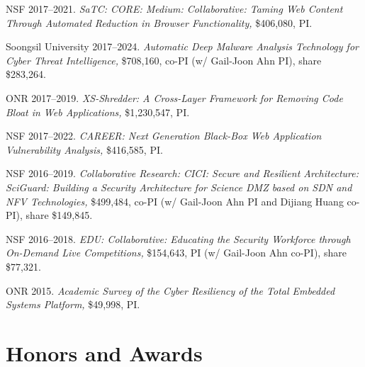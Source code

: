 \documentclass[11pt,letterpaper,sans]{moderncv}
\begin{document}
\begin{etaremune}
  \item NSF 2017--2021. \textit{SaTC: CORE: Medium: Collaborative:
    Taming Web Content Through Automated Reduction in Browser
    Functionality,} \$406,080, PI.

  \item Soongsil University 2017--2024. \textit{Automatic Deep Malware
    Analysis Technology for Cyber Threat Intelligence,} \$708,160,
    co-PI (w/ Gail-Joon Ahn PI), share \$283,264.

  \item ONR 2017--2019. \textit{XS-Shredder: A Cross-Layer Framework
    for Removing Code Bloat in Web Applications,} \$1,230,547, PI.

  \item NSF 2017--2022. \textit{CAREER: Next Generation Black-Box Web
    Application Vulnerability Analysis,} \$416,585, PI.

  \item NSF 2016--2019. \textit{Collaborative Research: CICI: Secure
    and Resilient Architecture: SciGuard: Building a Security
    Architecture for Science DMZ based on SDN and NFV Technologies,}
    \$499,484, co-PI (w/ Gail-Joon Ahn PI and Dijiang Huang co-PI),
    share \$149,845.

  \item NSF 2016--2018. \textit{EDU: Collaborative: Educating the
    Security Workforce through On-Demand Live Competitions,}
    \$154,643, PI (w/ Gail-Joon Ahn co-PI), share \$77,321.

  \item ONR 2015. \textit{Academic Survey of the Cyber Resiliency of
    the Total Embedded Systems Platform,} \$49,998, PI.

\end{etaremune}

\section{Honors and Awards}




\end{document}
